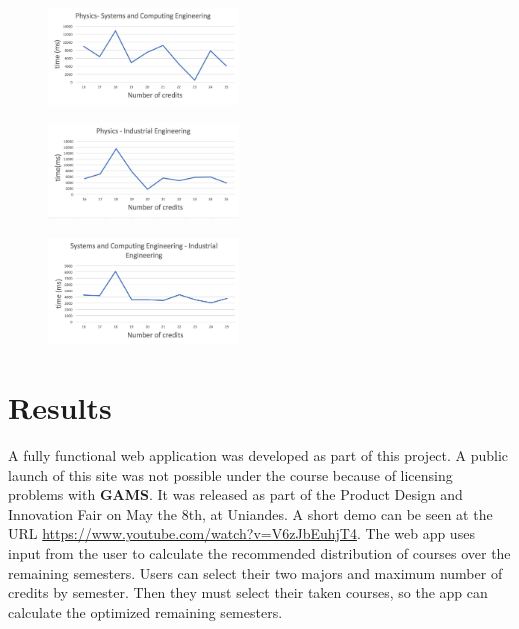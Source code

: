 \documentclass[journal]{IEEEtran}
\begin{document}
\begin{figure}[h!]
    \centering
    \includegraphics[width=0.45\textwidth]{img/fissis2}
    \label{fis_sis_t}
\end{figure}

\begin{figure}[h!]
    \centering
    \includegraphics[width=0.45\textwidth]{img/fisind2}

    \label{fis_ind_t}
\end{figure}

\begin{figure}[h!]
    \centering
    \includegraphics[width=0.45\textwidth]{img/indsis2}

    \label{ind_sis_t}
\end{figure}

\section{Results}

A fully functional web application was developed as part of this project. A public launch of this site was not possible under the course because of licensing problems with \textbf{GAMS}. It was released as part of the Product Design and Innovation Fair on May the 8th, at Uniandes. A short demo can be seen at the URL \url{https://www.youtube.com/watch?v=V6zJbEuhjT4}. The web app uses input from the user to calculate the recommended distribution of courses over the remaining semesters. Users can select their two majors and maximum number of credits by semester. Then they must select their taken courses, so the app can calculate the optimized remaining semesters.\\
\end{document}
